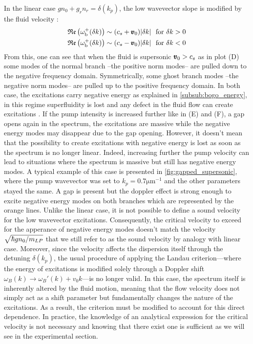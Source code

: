 In the linear case $gn_0+g_rn_r=\delta(k_p)$, the low wavevector slope is modified by the fluid velocity :
\begin{equation}
    \begin{aligned}
    \mathfrak{Re}\left(\omega_{\mathrm{b}}^+(\delta k)\right)& \sim (c_s + \pmb{v}_0)\abs{\delta k} \ \ \mathrm{for} \ \delta k > 0 \\
    \mathfrak{Re}\left(\omega_{\mathrm{b}}^+(\delta k)\right)& \sim (c_s - \pmb{v}_0)\abs{\delta k} \ \ \mathrm{for} \ \delta k < 0
    \end{aligned}
\end{equation}
From this, one can see that when the fluid is supersonic $\pmb{v}_0>c_s$ as in plot (D) some modes of the normal branch --the positive norm modes-- are pulled down to the negative frequency domain. Symmetrically, some ghost branch modes --the negative norm modes-- are pulled up to the positive frequency domain.
In both case, the excitations carry negative energy as explained in \autoref{subsub:bogo_energy}, in this regime superfluidity is lost and any defect in the fluid flow 
can create excitations \cite{Amo_fluidlightexp_2009}. If the pump intensity is increased further like in (E) and (F), a gap opens again in the spectrum, the excitations are massive while
the negative energy modes may disappear due to the gap opening. However, it doesn't mean that the possibility to create excitations with negative energy 
is lost as soon as the spectrum is no longer linear. Indeed, increasing further the pump velocity can lead to situations where the spectrum is massive but still has negative energy modes.
A typical example of this case is presented in \autoref{fig:gapped_supersonic}, where the pump wavevector was set to $k_p=0.7 \mathrm{\mu m^{-1}}$ and the other parameters stayed the same. 
A gap is present but the doppler effect is strong enough to excite negative energy modes on both branches which are represented by the orange lines. Unlike the linear case, it is not possible to define 
a sound velocity for the low wavevector excitations. Consequently, the critical velocity to exceed for the apperance of negative energy modes doesn't match the velocity $\sqrt{\hbar g n_0/m_{LP}}$ that we still refer to as the sound velocity
by analogy with linear case. Moreover, since the velocity affects the dispersion itself through the detuning $\delta(k_p)$, the usual procedure of applying the Landau criterion---where the energy of excitations is modified solely through a Doppler shift $\omega_B(k) \to \omega_B'(k) + v_0 k$---is no longer valid. In this case, the spectrum itself is inherently altered by the fluid motion, meaning that the flow velocity does not simply act as a shift parameter but fundamentally changes the nature of the excitations.
 As a result, the criterion must be modified to account for this direct dependence. In practice, the knowledge of an analytical 
 expression for the critical velocity is not necessary and knowing that there exist one is sufficient as we will see in the experimental section.
 




